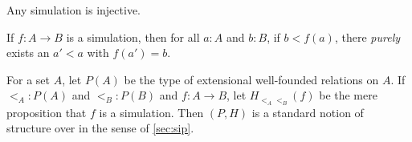 \documentclass[hott-all.tex]{subfiles}
\begin{document}
% 
\begin{lem}
  Any simulation is injective.
\end{lem}
% 
% 
% 
\begin{cor}
  If $f:A\to B$ is a simulation, then for all $a:A$ and $b:B$, if $b<f(a)$, there \emph{purely} exists an $a'<a$ with $f(a')=b$.
\end{cor}
% 
% 
\begin{thm}
  For a set $A$, let $P(A)$ be the type of extensional well-founded relations on $A$.
  If $\mathord{<_A} : P(A)$ and $\mathord{<_B} : P(B)$ and $f:A\to B$, let $H_{\mathord{<_A}\mathord{<_B}}(f)$ be the mere proposition that $f$ is a simulation.
  Then $(P,H)$ is a standard notion of structure over \uset in the sense of \cref{sec:sip}.
\end{thm}
\end{document}
